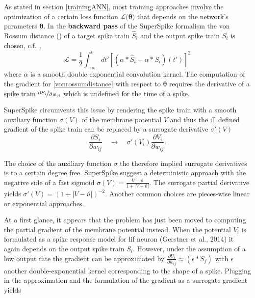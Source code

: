 
As stated in section \ref{trainingANN}, most training approaches involve the optimization of a certain loss function $\mathcal{L(\mathbf{\theta)}}$ that depends on the network's parameters $\mathbf{\theta}$. In the \textbf{backward pass} of the SuperSpike formalism the von Rossum distance (\cite{rossum01novel}) of a target spike train $\hat{S}_i$ and the output spike train $S_i$ is chosen, c.f. \cite{zenke2018superspike},
\begin{equation}
\label{vonrossumdistance}
\mathcal{L} = \frac{1}{2} \int^t_{-\infty}dt' \left[\left(\alpha \ast \hat{S}_i - \alpha \ast S_i \right)(t')\right]^2
\end{equation}
where $\alpha$ is a smooth double exponential convolution kernel. The computation of the gradient for \ref{vonrossumdistance} with respect to $\mathbf{\theta}$ requires the derivative of a spike train $\nicefrac{\partial{S_i}}{\partial{w_{ij}}}$ which is undefined for the time of a spike. 

SuperSpike circumvents this issue by rendering the spike train with a smooth auxiliary function $\sigma(V)$ of the membrane potential $V$ and thus the ill defined gradient of the spike train can be replaced by a surrogate derivative $\sigma'(V)$
\begin{equation}
\frac{\partial S_i}{\partial w_{ij}} \quad \rightarrow \quad \sigma'(V_i)\frac{\partial V_i}{\partial w_{ij}}.
\end{equation}

The choice of the auxiliary function $\sigma$ the therefore implied surrogate derivatives is to a certain degree free. SuperSpike suggest a deterministic approach with the negative side of a fast sigmoid $\sigma(V) = \frac{V - \vartheta}{1 + |V - \vartheta|}$. The surrogate partial derivative yields $\sigma'(V) = \left(1 + |V - \vartheta|\right)^{-2}$. Another common choices are pieces-wise linear or exponential approaches.

At a first glance, it appears that the problem has just been moved to computing the partial gradient of the membrane potential instead. When the potential $V_i$ is formulated as a spike response model for \gls{lif} neuron (Gerstner et al., 2014) it again depends on the output spike train $S_i$. However, under the assumption of a low output rate the gradient can be approximated by $\frac{\partial U_i}{\partial w_{ij}} \approx (\epsilon \ast S_j)$ with $\epsilon$ another double-exponential kernel corresponding to the shape of a spike. Plugging in the approximation and the formulation of the gradient as a surrogate gradient yields

